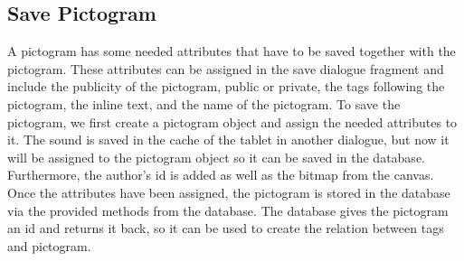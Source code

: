 \subsection{Save Pictogram}
A pictogram has some needed attributes that have to be saved together with the pictogram.
These attributes can be assigned in the save dialogue fragment and include the publicity of the pictogram, public or private, the tags following the pictogram, the inline text, and the name of the pictogram.
To save the pictogram, we first create a pictogram object and assign the needed attributes to it.
The sound is saved in the cache of the tablet in another dialogue, but now it will be assigned to the pictogram object so it can be saved in the database.
Furthermore, the author's id is added as well as the bitmap from the canvas.
Once the attributes have been assigned, the pictogram is stored in the database via the provided methods from the database.
The database gives the pictogram an id and returns it back, so it can be used to create the relation between tags and pictogram.
